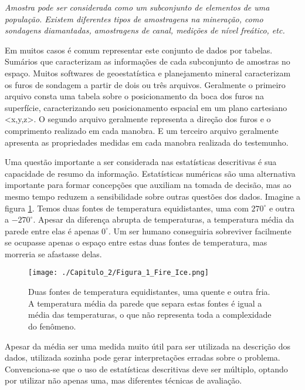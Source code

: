 \begin{definition}[Amostra]
	\textit{Amostra pode ser considerada como um subconjunto de elementos de uma população. Existem diferentes tipos de amostragens na mineração, como sondagens diamantadas, amostragens de canal, medições de nível freático, etc.}
\end{definition}

Em muitos casos é comum representar este conjunto de dados por tabelas. Sumários que caracterizam as informações de cada subconjunto de amostras no espaço. Muitos softwares de geoestatística e planejamento mineral caracterizam os furos de sondagem a partir de dois ou três arquivos. Geralmente o primeiro arquivo consta uma tabela sobre o posicionamento da boca dos furos na superfície, caracterizando seu posicionamento espacial em um plano cartesiano <x,y,z>. O segundo arquivo geralmente representa a direção dos furos e o comprimento realizado em cada manobra. E um terceiro arquivo geralmente apresenta as propriedades medidas em cada manobra realizada do testemunho.

Uma questão importante a ser considerada nas estatísticas descritivas é sua capacidade de resumo da informação. Estatísticas numéricas são uma alternativa importante para formar concepções que auxiliam na tomada de decisão, mas ao mesmo tempo reduzem a sensibilidade sobre outras questões dos dados. Imagine a figura \ref{Fig1:Cap2}. Temos duas fontes de temperatura equidistantes, uma com $270^{\circ}$ e outra a $-270^{\circ}$. Apesar da diferença abrupta de temperaturas, a temperatura média da parede entre elas é apenas $0^{\circ}$. Um ser humano conseguiria sobreviver facilmente se ocupasse apenas o espaço entre estas duas fontes de temperatura, mas morreria se afastasse delas. 

\FloatBarrier
\begin{figure}[!htb]
	\centering
	\texttt{[image: ./Capitulo\_2/Figura\_1\_Fire\_Ice.png]}	
	\caption{Duas fontes de temperatura equidistantes, uma quente e outra fria. A temperatura média da parede que separa estas fontes é igual a média das temperaturas, o que não representa toda a complexidade do fenômeno.}
	\label{Fig1:Cap2}
\end{figure}
\FloatBarrier

Apesar da média ser uma medida muito útil para ser utilizada na descrição dos dados, utilizada sozinha pode gerar interpretações erradas sobre o problema. Convenciona-se que o uso de estatísticas descritivas deve ser múltiplo, optando por utilizar não apenas uma, mas diferentes técnicas de avaliação. 


